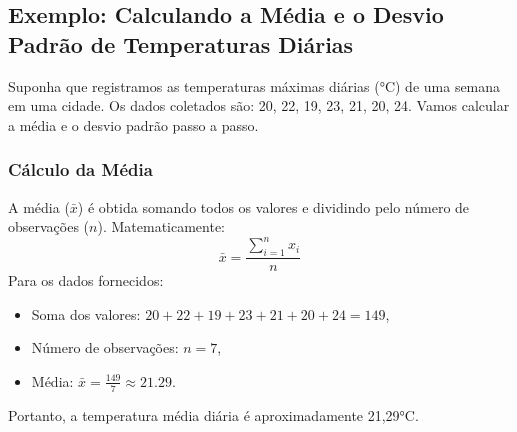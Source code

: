 \documentclass[a4paper,12pt,openany]{book}
\begin{document}
\subsection{Exemplo: Calculando a Média e o Desvio Padrão de Temperaturas Diárias}

Suponha que registramos as temperaturas máximas diárias (°C) de uma semana em uma cidade. Os dados coletados são: 20, 22, 19, 23, 21, 20, 24. Vamos calcular a média e o desvio padrão passo a passo.

\subsubsection{Cálculo da Média}
A média (\(\bar{x}\)) é obtida somando todos os valores e dividindo pelo número de observações (\(n\)). Matematicamente:
\begin{equation}
\bar{x} = \frac{\sum_{i=1}^{n} x_i}{n}
\end{equation}
Para os dados fornecidos:
\begin{itemize}
    \item Soma dos valores: \(20 + 22 + 19 + 23 + 21 + 20 + 24 = 149\),
    \item Número de observações: \(n = 7\),
    \item Média: \(\bar{x} = \frac{149}{7} \approx 21.29\).
\end{itemize}
Portanto, a temperatura média diária é aproximadamente 21,29°C.
\end{document}
